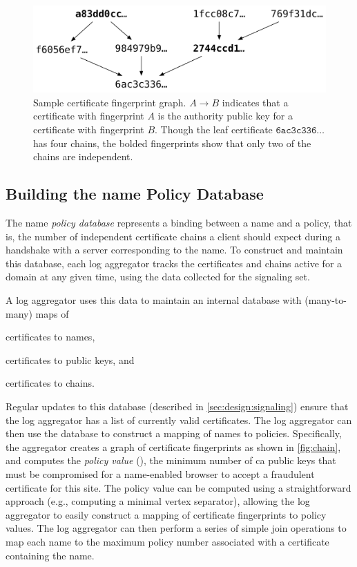 \begin{figure}
  \centering
  \includegraphics[width=0.85\linewidth]{fig/chain}
  \vspace{-3mm}
  \caption{Sample certificate fingerprint graph. $A \rightarrow B$ indicates
    that a certificate with fingerprint $A$ is the authority public key for a
    certificate with fingerprint $B$. Though the leaf certificate
    $\texttt{6ac3c336}\ldots$ has four chains, the bolded fingerprints show that
    only two of the chains are independent.}
  \label{fig:chain}
  \vspace{-3mm}
\end{figure}

\subsection{Building the \ac{name} Policy Database}
\label{sec:design:policy}

The \ac{name} \emph{policy database} represents a binding between a name and a policy, that
is, the number of independent certificate chains a client
should expect during a handshake with a server corresponding to the name.
To construct and maintain this database, each log aggregator tracks 
the certificates and chains active for a domain at any given time,
using the data collected for the signaling set.

A log aggregator uses this data to maintain an internal database with
(many-to-many) maps of
\begin{inparaenum}
\item certificates to names,
\item certificates to public keys, and
\item certificates to chains.
\end{inparaenum}
Regular updates to this database (described in \autoref{sec:design:signaling})
ensure that the log aggregator has a list of currently valid certificates. The
log aggregator can then use the database to construct a mapping of names to
policies. Specifically, the aggregator creates a graph of certificate
fingerprints as shown in \autoref{fig:chain}, and computes the \emph{policy
value} (\policy), the minimum number of \ac{ca} public keys that must be
compromised for a \ac{name}-enabled browser to accept a fraudulent certificate
for this site. The policy value can be computed using a straightforward approach
(e.g., computing a minimal vertex separator), allowing the log aggregator to
easily construct a mapping of certificate fingerprints to policy values. The log
aggregator can then perform a series of simple join operations to map each name
to the maximum policy number associated with a certificate containing the name.

